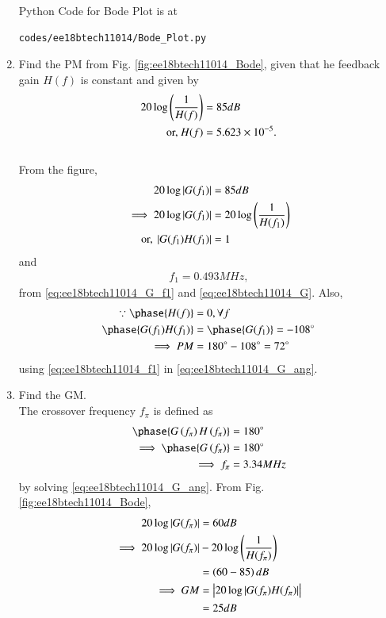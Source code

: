 \begin{enumerate}[label=\thesection.\arabic*.,ref=\thesection.\theenumi]
Python Code for Bode Plot is at
\begin{lstlisting}
codes/ee18btech11014/Bode_Plot.py
\end{lstlisting}

\item Find the PM from  Fig.  	\ref{fig:ee18btech11014_Bode}, given that he feedback gain $H(f)$ is constant and given by 
\begin{align}
20 \log \left(\frac{1}{H(f) }\right) &= 85 dB
\\
\text{or, } H(f) &= 5.623 \times 10^{-5}.
\label{eq:ee18btech11014_H}
\end{align}
\\
\solution From the figure, 
\begin{align}
\label{eq:ee18btech11014_G_f1}
20 \log \left\vert G(f_1)\right\vert &= 85 dB
\\
\implies 20 \log \left\vert G(f_1)\right\vert & = 20 \log \left(\frac{1}{H(f_1) }\right)
\\
\text{or, } \left\vert G(f_1)H(f_1)\right\vert &= 1
\end{align}
and 
\begin{align}
\label{eq:ee18btech11014_f1}
f_1 = 0.493 MHz, 
\end{align}
from \eqref{eq:ee18btech11014_G_f1} and \eqref{eq:ee18btech11014_G}.
Also,
%
\begin{align}
\because \phase{H(f)} &= 0, \forall f
\\
\phase{G(f_1)H(f_1)} &= \phase{G(f_1)} = -108 \degree
\\
\implies PM &= 180 \degree - 108 \degree = 72 \degree
\end{align}
using \eqref{eq:ee18btech11014_f1} in \eqref{eq:ee18btech11014_G_ang}.

\item Find the GM.
\\
\solution The crossover frequency $f_{\pi}$ is defined as 
\begin{align}
\phase{G\brak{f_{\pi}}H\brak{f_{\pi}}} &= 180 \degree
\\
\implies \phase{G\brak{f_{\pi}}} &= 180 \degree
\\
\implies f_{\pi} &= 3.34 MHz
\end{align}
by solving \eqref{eq:ee18btech11014_G_ang}.
From Fig.  \ref{fig:ee18btech11014_Bode}, 
\begin{align}
20 \log \left\vert G(f_\pi)\right\vert &= 60 dB
\\
\implies 20 \log \left\vert G(f_\pi)\right\vert &-  20 \log \left(\frac{1}{H(f_\pi) }\right)   
\nonumber \\
&= \left(60 -85\right) dB
\\
\implies GM &= \left\vert20 \log \left\vert G(f_\pi)H(f_\pi) \right\vert\right\vert 
\nonumber \\
&= 25 dB
\end{align}
%


\end{enumerate}
